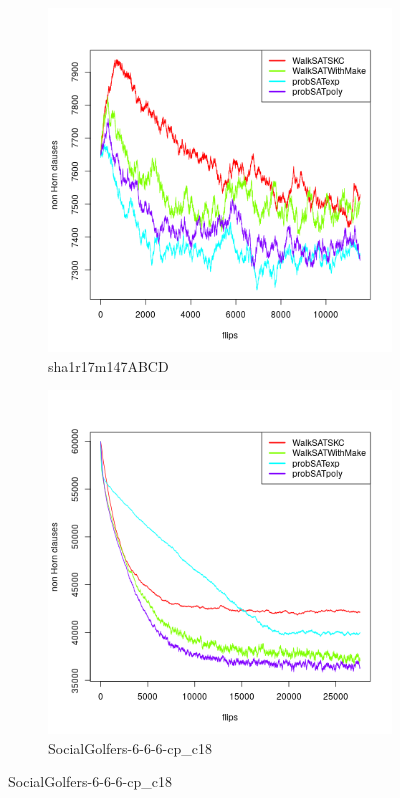 \documentclass[12pt,a4paper]{article}
\begin{document}
\begin{figure}[H]\ContinuedFloat
  \begin{subfigure}{0.45\textwidth}
    \includegraphics[width=\textwidth]{trends/sha1r17m147ABCD[SKIP=0].png}
    \caption{sha1r17m147ABCD}
  \end{subfigure}
  \begin{subfigure}{0.45\textwidth}
    \includegraphics[width=\textwidth]{trends/SocialGolfers-6-6-6-cp_c18[SKIP=0].png}
    \caption{SocialGolfers-6-6-6-cp\_c18}
  \end{subfigure}


\end{figure}
\end{document}
